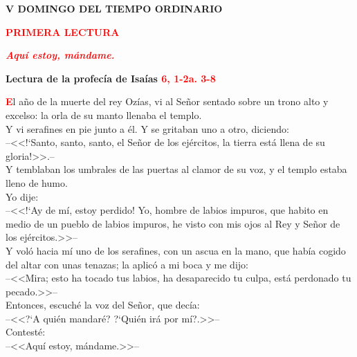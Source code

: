 \documentclass[12pt, letterpaper]{report}
\begin{document}

    \begin{center}
    \Huge {\bfseries V DOMINGO DEL TIEMPO ORDINARIO}
    \end{center}

    \begin{center}
    \Large {\bfseries \textcolor{red}{PRIMERA LECTURA}}
    \end{center}

    \begin{center}
    \large {\bfseries \textit{ \textcolor{red}{Aqu\'i estoy, m\'andame.}}}
    \end{center}

    \Large {\bfseries Lectura de la profec\'ia de  Isa\'ias \hspace{1cm} \textcolor{red}{6, 1-2a. 3-8}}

    \lettrine[lines=2]{\bfseries \textcolor{red}{E}}{}\Large l a\~no de la muerte del rey Oz\'ias, vi al Se\~nor sentado sobre un trono alto y excelso: la orla de su manto llenaba el templo. \\
    Y vi serafines en pie junto a \'el. Y se gritaban uno a otro, diciendo:\\
    --<<!`Santo, santo, santo, el Se\~nor de los ej\'ercitos, la tierra est\'a llena de su gloria!>>.--\\
    Y temblaban los umbrales de las puertas al clamor de su voz, y el templo estaba lleno de humo. \\
    Yo dije:\\
    --<<!`Ay de m\'i, estoy perdido! Yo, hombre de labios impuros, que habito en medio de un pueblo de labios impuros, he visto con mis ojos al Rey y Se\~nor de los ej\'ercitos.>>--\\
    Y vol\'o hacia m\'i uno de los serafines, con un ascua en la mano, que hab\'ia cogido del altar con unas tenazas; la aplic\'o a mi boca y me dijo:\\
    --<<Mira; esto ha tocado tus labios, ha desaparecido tu culpa, est\'a perdonado tu pecado.>>--\\
    Entonces, escuch\'e la voz del Se\~nor, que dec\'ia:\\
    --<<?`A qui\'en mandar\'e? ?`Qui\'en ir\'a por m\'i?.>>--\\
    Contest\'e:\\
    --<<Aqu\'i estoy, m\'andame.>>--
\end{document}
